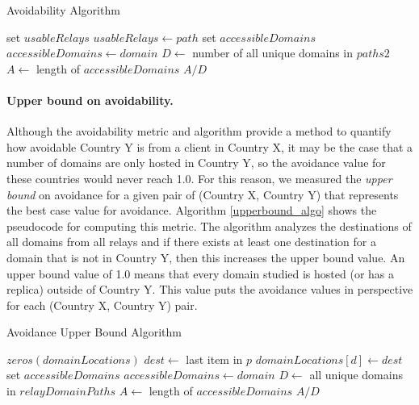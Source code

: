 \begin{algorithm}[t]
\caption{Avoidability Algorithm}
\label{avoid_algo}
\small
\begin{algorithmic}[1]
    \State set $usableRelays$
		\State $usableRelays \gets path$
	\EndIf
    \EndFor
    \State set $accessibleDomains$
        \State $accessibleDomains \gets domain$
        \EndIf
    \EndIf
    \EndFor
    \State $D \gets$ number of all unique domains in $paths2$
    \State $A \gets$ length of $accessibleDomains$
    \State \Return $A / D$
\EndFunction
\end{algorithmic}
\end{algorithm}


\paragraph{Upper bound on avoidability.}  Although the avoidability
metric and algorithm provide a method to quantify how avoidable Country
Y is from a client in Country X, it may be the case that a number of
domains are only hosted in Country Y, so the avoidance value for these
countries would never reach 1.0.  For this reason, we measured the {\em upper
bound} on avoidance for a given pair of (Country X, Country Y) that
represents the best case value for avoidance.  
Algorithm \ref{upperbound_algo} shows the pseudocode for computing this metric. The algorithm analyzes the destinations of all domains from all relays and if there exists at least one destination for a domain that is not in Country Y, then this increases the upper bound value.  An upper bound value of 1.0 means that every domain studied is hosted (or has a replica) outside of Country Y.  This value puts the avoidance values in perspective for each (Country X, Country Y) pair. 

\begin{algorithm}[t]
\caption{Avoidance Upper Bound Algorithm}
\label{upperbound_algo}
\small
\begin{algorithmic}[1]
    \State $zeros(domainLocations)$
		\State $dest \gets $ last item in $p$
		\State $domainLocations[d] \gets dest$
    \EndFor
    \State set $accessibleDomains$
    \State $accessibleDomains \gets domain$
    \EndIf
    \EndFor
    \State $D \gets$ all unique domains in  $relayDomainPaths$
    \State $A \gets$ length of $accessibleDomains$
    \State \Return $A / D$
\EndFunction
\end{algorithmic}
\end{algorithm}

